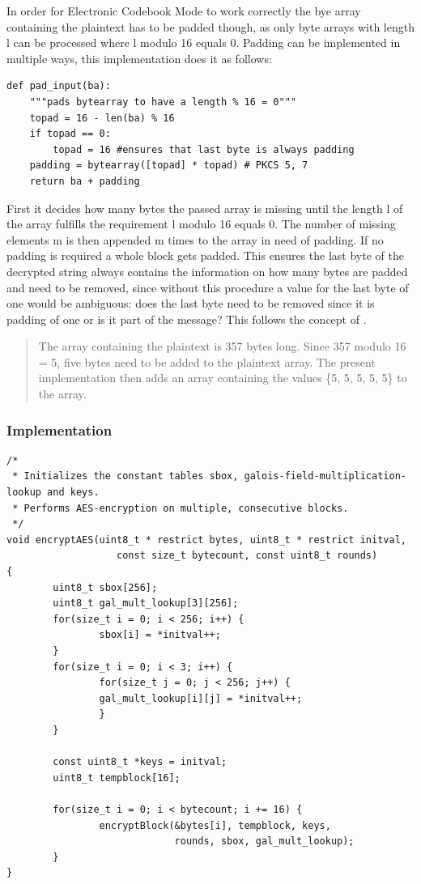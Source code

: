 In order for Electronic Codebook Mode to work correctly the bye array
containing the plaintext has to be padded though, as only byte arrays
with length l can be processed where l modulo 16 equals 0. Padding can
be implemented in multiple ways, this implementation does it as follows:

\begin{lstlisting}
def pad_input(ba):
    """pads bytearray to have a length % 16 = 0"""
    topad = 16 - len(ba) % 16
    if topad == 0:
        topad = 16 #ensures that last byte is always padding
    padding = bytearray([topad] * topad) # PKCS 5, 7
    return ba + padding
\end{lstlisting}

First it decides how many bytes the passed array is missing until the
length l of the array fulfills the requirement l modulo 16 equals 0. The
number of missing elements m is then appended m times to the array in
need of padding. If no padding is required a whole block gets padded.
This ensures the last byte of the decrypted string always contains the
information on how many bytes are padded and need to be removed, since
without this procedure a value for the last byte of one would be
ambiguous: does the last byte need to be removed since it is padding of
one or is it part of the message? This follows the concept of \cite[ch. 10.3 Note 2]{RFC2315}.

\begin{quote}
The array containing the plaintext is 357 bytes long. Since 357 modulo 16 = 5,
five bytes need to be added to the plaintext array. The present
implementation then adds an array containing the values \{5, 5, 5, 5,
5\} to the array.
\end{quote}

\hypertarget{implementation-6}{%
\subsubsection{Implementation}\label{implementation-6}}

\begin{lstlisting}
/*
 * Initializes the constant tables sbox, galois-field-multiplication-lookup and keys.
 * Performs AES-encryption on multiple, consecutive blocks.
 */
void encryptAES(uint8_t * restrict bytes, uint8_t * restrict initval,
                   const size_t bytecount, const uint8_t rounds)
{
        uint8_t sbox[256];
        uint8_t gal_mult_lookup[3][256];
        for(size_t i = 0; i < 256; i++) {
                sbox[i] = *initval++;
        }
        for(size_t i = 0; i < 3; i++) {
                for(size_t j = 0; j < 256; j++) {
                gal_mult_lookup[i][j] = *initval++;
                }
        }

        const uint8_t *keys = initval;
        uint8_t tempblock[16];

        for(size_t i = 0; i < bytecount; i += 16) {
                encryptBlock(&bytes[i], tempblock, keys,
                             rounds, sbox, gal_mult_lookup);
        }
}
\end{lstlisting}

